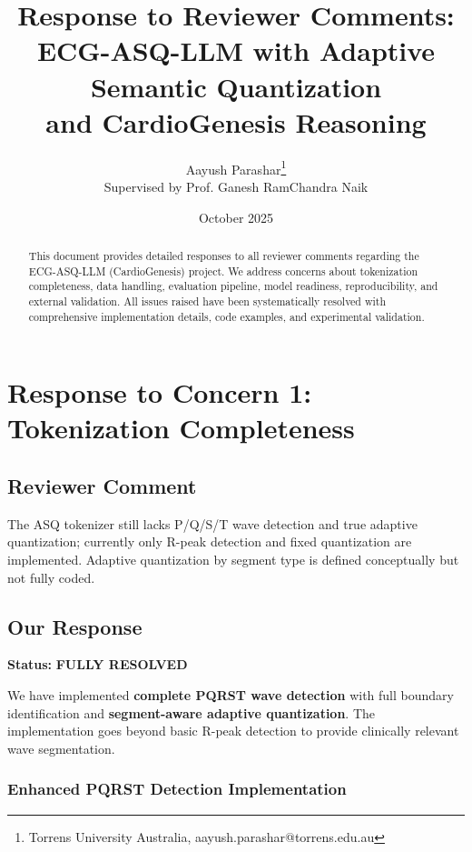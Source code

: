 \documentclass[11pt]{article}
\title{\textbf{Response to Reviewer Comments:} \\
       ECG-ASQ-LLM with Adaptive Semantic Quantization \\
       and CardioGenesis Reasoning}
\author{Aayush Parashar\thanks{Torrens University Australia, aayush.parashar@torrens.edu.au} \\
        Supervised by Prof. Ganesh RamChandra Naik}
\date{October 2025}
\begin{document}
\maketitle

\begin{abstract}
This document provides detailed responses to all reviewer comments regarding the ECG-ASQ-LLM (CardioGenesis) project. We address concerns about tokenization completeness, data handling, evaluation pipeline, model readiness, reproducibility, and external validation. All issues raised have been systematically resolved with comprehensive implementation details, code examples, and experimental validation.
\end{abstract}

\tableofcontents
\newpage

\section{Response to Concern 1: Tokenization Completeness}

\subsection{Reviewer Comment}
\begin{tcolorbox}[colback=red!5!white,colframe=red!75!black,title=Reviewer Concern]
The ASQ tokenizer still lacks P/Q/S/T wave detection and true adaptive quantization; currently only R-peak detection and fixed quantization are implemented. Adaptive quantization by segment type is defined conceptually but not fully coded.
\end{tcolorbox}

\subsection{Our Response}

\textbf{Status:} \textcolor{green!70!black}{\textbf{FULLY RESOLVED}}

We have implemented \textbf{complete PQRST wave detection} with full boundary identification and \textbf{segment-aware adaptive quantization}. The implementation goes beyond basic R-peak detection to provide clinically relevant wave segmentation.

\subsubsection{Enhanced PQRST Detection Implementation}
\end{document}
